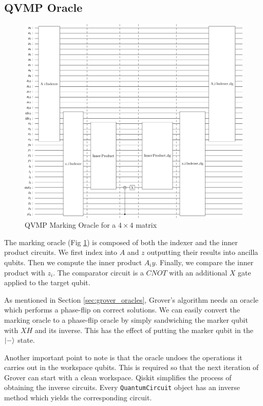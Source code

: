 \documentclass[10pt]{proc}
\theoremstyle{definition}
\theoremstyle{remark}
\begin{document}
\subsection{QVMP Oracle}
\begin{figure}
  \centering
  \includegraphics[scale=0.3]{results/oracle_circuit_4x4.png} 
  \caption{QVMP Marking Oracle for a $4 \times 4$ matrix}
  \label{fig:marking_oracle_4x4}
\end{figure}
The marking oracle (Fig \ref{fig:marking_oracle_4x4}) is composed of both the
indexer and the inner product circuits. We first index into $A$ and $z$
outputting their results into ancilla qubits. Then we compute the inner product
$A_iy$. Finally, we compare the inner product with $z_i$. The comparator
circuit is a $CNOT$ with an additional $X$ gate applied to the target qubit.

As mentioned in Section \ref{sec:grover_oracles}, Grover's algorithm needs an
oracle which performs a phase-flip on correct solutions. We can easily convert
the marking oracle to a phase-flip oracle by simply sandwiching the marker
qubit with $XH$ and its inverse. This has the effect of putting the marker
qubit in the $\ket{-}$ state.

Another important point to note is that the oracle undoes the operations it
carries out in the workspace qubits. This is required so that the next
iteration of Grover can start with a clean workspace. Qiskit simplifies the
process of obtaining the inverse circuits. Every \verb|QuantumCircuit| object has
an inverse method which yields the corresponding circuit.
\end{document}
